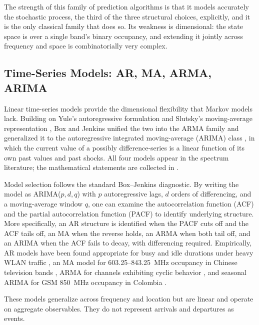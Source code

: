 \documentclass[lettersize,journal]{IEEEtran}
\begin{document}
The strength of this family of prediction algorithms is that it models accurately
the stochastic process, the third of the three structural
choices, explicitly, and it is the only classical family that does so.
Its weakness is dimensional: the state space is over a single band's
binary occupancy, and extending it jointly across frequency and space is
combinatorially very complex.

\subsection{\textbf{Time-Series Models: AR, MA, ARMA, ARIMA}}
Linear time-series models provide the dimensional flexibility that
Markov models lack. Building on Yule's autoregressive formulation
\cite{Yule1927} and Slutsky's moving-average representation
\cite{Slutsky1937}, Box and Jenkins unified the two into the ARMA family
and generalized it to the autoregressive integrated moving-average
(ARIMA) class \cite{Box1978}, in which the current value of a possibly
difference-series is a linear function of its own past values and past
shocks. All four models appear in the spectrum literature; the
mathematical statements are collected in \cite{Ding2018}.

Model selection follows the standard Box--Jenkins diagnostic. By writing
the model as ARIMA($p,d,q$) with $p$ autoregressive lags, $d$ orders of
differencing, and a moving-average window $q$, one can examine the
autocorrelation function (ACF) and the partial autocorrelation function
(PACF) to identify underlying structure.
More specifically, an AR structure is identified when the PACF cuts off and the ACF
tails off, an MA when the reverse holds, an ARMA when both tail off, and an ARIMA
when the ACF fails to decay, with differencing required.
Empirically, AR models have been found appropriate for busy and idle
durations under heavy WLAN traffic \cite{Hou2021}, an MA model for
603.25--843.25~MHz occupancy in Chinese television bands \cite{Su2009}, ARMA for
channels exhibiting cyclic behavior \cite{Tabassam2011}, and seasonal ARIMA for
GSM 850~MHz occupancy in Colombia \cite{Pedraza2016}.

These models generalize across frequency and location but are linear and
operate on aggregate observables.
They do not represent arrivals and departures as events.
\end{document}
